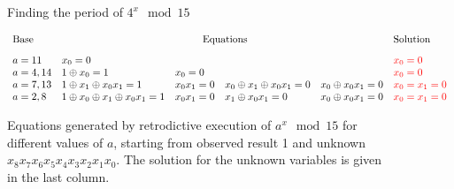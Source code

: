 \documentclass[sigplan,screen]{acmart}
\newcommand{\red}[1]{{\color{red}{#1}}}
\theoremstyle{definition}
\begin{document}
\begin{figure}
\begin{center}
\end{center}
\caption{\label{fig:shor15}Finding the period of $4^x \mod{15}$}
\end{figure}
\begin{figure}
\[\begin{array}{l@{\quad}lllll}
\textrm{Base} & \multicolumn{4}{c}{\textrm{Equations}} & \textrm{Solution} \\[2ex]
a=11 & x_0 = 0 &&&& \red{x_0 = 0} \\
a=4,14 & 1 \oplus x_0 = 1 & x_0 = 0 &&
  & \red{x_0 = 0} \\
a=7,13 & 1 \oplus x_1 \oplus x_0x_1 = 1 & x_0x_1 = 0 & x_0 \oplus x_1 \oplus x_0x_1 = 0 &  x_0 \oplus x_0x_1 = 0 & \red{x_0=x_1=0} \\
a=2,8 & 1 \oplus x_0 \oplus x_1 \oplus x_0x_1 = 1 & x_0x_1 = 0 & x_1 \oplus x_0x_1 = 0 & x_0 \oplus x_0x_1 = 0  & \red{x_0=x_1=0}
\end{array}\]
\caption{\label{fig:shor-eqs}Equations generated by retrodictive
  execution of $a^x \mod{15}$ for different values of $a$, starting
  from observed result 1 and unknown
  $x_8x_7x_6x_5x_4x_3x_2x_1x_0$. The solution for the unknown
  variables is given in the last column.}
\end{figure}
\end{document}
